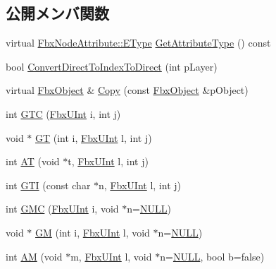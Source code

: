 \subsection*{公開メンバ関数}
\begin{DoxyCompactItemize}
\item 
virtual \hyperlink{class_fbx_node_attribute_a08e1669d3d1a696910756ab17de56d6a}{Fbx\+Node\+Attribute\+::\+E\+Type} \hyperlink{class_fbx_layer_container_a578a24bfcd49464813a4b5b08a12ec59}{Get\+Attribute\+Type} () const
\item 
bool \hyperlink{class_fbx_layer_container_a51f106917fbb0a9558f1f0ee1f7d7059}{Convert\+Direct\+To\+Index\+To\+Direct} (int p\+Layer)
\item 
virtual \hyperlink{class_fbx_object}{Fbx\+Object} \& \hyperlink{class_fbx_layer_container_abb8c7ba2b201b4e4ff39b2c8db144769}{Copy} (const \hyperlink{class_fbx_object}{Fbx\+Object} \&p\+Object)
\item 
int \hyperlink{class_fbx_layer_container_a6f4b9a4b47dadd5ed0b80a3677042514}{G\+TC} (\hyperlink{fbxtypes_8h_ae9fb141d8158a730aa85ec5ff2ea3f6b}{Fbx\+U\+Int} i, int j)
\item 
void $\ast$ \hyperlink{class_fbx_layer_container_a9fe0f22f34716fa8c8e0e0b85f8766f1}{GT} (int i, \hyperlink{fbxtypes_8h_ae9fb141d8158a730aa85ec5ff2ea3f6b}{Fbx\+U\+Int} l, int j)
\item 
int \hyperlink{class_fbx_layer_container_abd3b8871f32f8af58c029fedcae6e7de}{AT} (void $\ast$t, \hyperlink{fbxtypes_8h_ae9fb141d8158a730aa85ec5ff2ea3f6b}{Fbx\+U\+Int} l, int j)
\item 
int \hyperlink{class_fbx_layer_container_a8b96ebd4871a4c169e39fa7d8df3c48d}{G\+TI} (const char $\ast$n, \hyperlink{fbxtypes_8h_ae9fb141d8158a730aa85ec5ff2ea3f6b}{Fbx\+U\+Int} l, int j)
\item 
int \hyperlink{class_fbx_layer_container_a2995407b3e9bb567396995204df03c25}{G\+MC} (\hyperlink{fbxtypes_8h_ae9fb141d8158a730aa85ec5ff2ea3f6b}{Fbx\+U\+Int} i, void $\ast$n=\hyperlink{fbxarch_8h_a070d2ce7b6bb7e5c05602aa8c308d0c4}{N\+U\+LL})
\item 
void $\ast$ \hyperlink{class_fbx_layer_container_a9147aaf26ffa349599d71aa4e1755197}{GM} (int i, \hyperlink{fbxtypes_8h_ae9fb141d8158a730aa85ec5ff2ea3f6b}{Fbx\+U\+Int} l, void $\ast$n=\hyperlink{fbxarch_8h_a070d2ce7b6bb7e5c05602aa8c308d0c4}{N\+U\+LL})
\item 
int \hyperlink{class_fbx_layer_container_a273820824e7c6db2b40dabfb44c3ca5b}{AM} (void $\ast$m, \hyperlink{fbxtypes_8h_ae9fb141d8158a730aa85ec5ff2ea3f6b}{Fbx\+U\+Int} l, void $\ast$n=\hyperlink{fbxarch_8h_a070d2ce7b6bb7e5c05602aa8c308d0c4}{N\+U\+LL}, bool b=false)

\end{DoxyCompactItemize}
